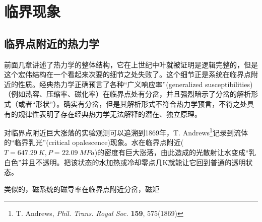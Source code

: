 \chapter{临界现象}
\label{chap10}

\section{临界点附近的热力学}
\label{sec10.1}
前面几章讲述了热力学的整体结构，它在上世纪中叶就被证明是逻辑完整的，但是这个宏伟结构在一个看起来次要的细节之处失败了。这个细节正是系统在临界点附近的性质。经典热力学正确预言了各种“广义响应率”(generalized susceptibilities)（例如热容、压缩率、磁化率）在临界点处有分岔，并且强烈暗示了分岔的解析形式（或者“形状”）。确实有分岔，但是其解析形式不符合热力学预言，不符之处具有的规律性表明了存在经典热力学无法解释的潜在、独立原理。

对临界点附近巨大涨落的实验观测可以追溯到1869年，T. Andrews\footnote{T. Andrews, {\it Phil. Trans. Royal Soc. } {\bf 159}, 575(1869)}记录到流体的“临界乳光”(critical opalescence)现象。水在临界点附近($T = \SI{647.29}{K}, P = \SI{22.09}{MPa}$)的密度有巨大涨落，由此造成的光散射让水变成“乳白色”并且不透明。把该状态的水加热或冷却零点几K就能让它回到普通的透明状态。

类似的，磁系统的磁导率在临界点附近分岔，磁矩